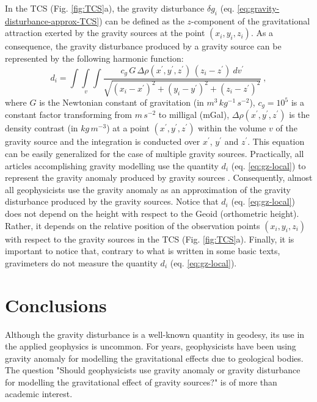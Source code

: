 \documentclass[extra]{gji}
\begin{document}
In the TCS (Fig. \ref{fig:TCS}a),
the gravity disturbance $\delta g_{i}$ (eq. \ref{eq:gravity-disturbance-approx-TCS})
can be defined as the $z$-component of the gravitational attraction exerted by
the gravity sources at the point $(x_{i}, y_{i}, z_{i})$.
As a consequence, the gravity disturbance produced by
a gravity source can be represented by the following harmonic function:
\begin{equation}
d_{i} = \int\int\limits_{v}\int
\frac{c_{g} \, G \, \Delta\rho(x^{\prime}, y^{\prime}, z^{\prime})
\, (z_{i} - z^{\prime}) \: dv^{\prime}}
{\sqrt{(x_{i} - x^{\prime})^{2} +
(y_{i} - y^{\prime})^{2} + (z_{i} - z^{\prime})^{2}}} \: ,
\label{eq:gz-local}
\end{equation}
where $G$ is the Newtonian constant of gravitation (in $m^{3} \, kg^{-1} \, s^{-2}$),
$c_{g} = 10^{5}$ is a constant factor transforming from $m \, s^{-2}$
to milligal (mGal), $\Delta\rho(x^{\prime}, y^{\prime}, z^{\prime})$
is the density contrast (in $kg \, m^{-3}$) at a point
$(x^{\prime}, y^{\prime}, z^{\prime})$ within
the volume $v$ of the gravity source and the integration is conducted
over $x^{\prime}$, $y^{\prime}$ and $z^{\prime}$.
This equation can be easily generalized for the case
of multiple gravity sources.
Practically, all articles accomplishing gravity modelling
use the quantity $d_{i}$ (eq. \ref{eq:gz-local})
to represent the gravity anomaly produced by
gravity sources \citep[e.g.,][]{blakely1996}.
Consequently, almost all geophysicists use the gravity
anomaly as an approximation of the gravity disturbance
produced by the gravity sources. Notice that $d_{i}$
(eq. \ref{eq:gz-local}) does not depend on the
height with respect to the Geoid (orthometric height).
Rather, it depends on the relative position
of the observation points $(x_{i}, y_{i}, z_{i})$ with respect to
the gravity sources in the TCS (Fig. \ref{fig:TCS}a).
Finally, it is important to notice that, contrary to what
is written in some basic texts, gravimeters do not measure
the quantity $d_{i}$ (eq. \ref{eq:gz-local}).


\section{Conclusions}

Although the gravity disturbance is a well-known quantity in geodesy,
its use in the applied geophysics is uncommon.
For years, geophysicists have been using gravity anomaly for modelling
the gravitational effects due to geological bodies.
The question "Should geophysicists use gravity anomaly or gravity
disturbance for modelling the gravitational effect of gravity sources?"
is of more than academic interest.
\end{document}
